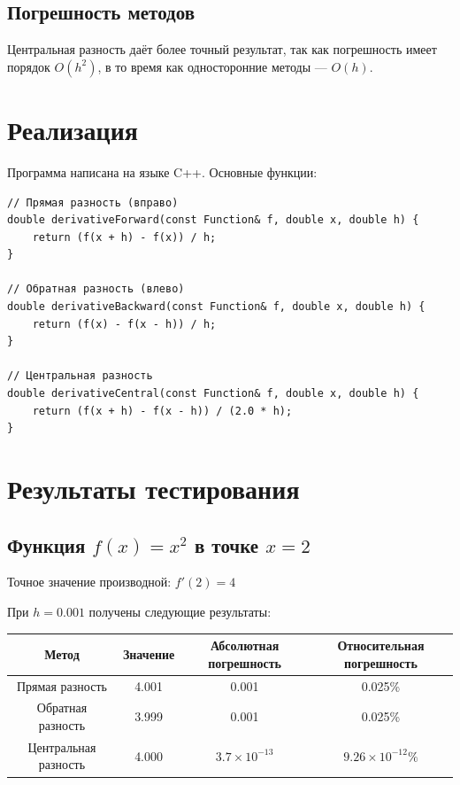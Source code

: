 \documentclass[12pt,a4paper]{article}
\begin{document}
\subsection{Погрешность методов}

Центральная разность даёт более точный результат, так как погрешность имеет порядок $O(h^2)$, в то время как односторонние методы — $O(h)$.

\section{Реализация}

Программа написана на языке C++. Основные функции:

\begin{lstlisting}
// Прямая разность (вправо)
double derivativeForward(const Function& f, double x, double h) {
    return (f(x + h) - f(x)) / h;
}

// Обратная разность (влево)
double derivativeBackward(const Function& f, double x, double h) {
    return (f(x) - f(x - h)) / h;
}

// Центральная разность
double derivativeCentral(const Function& f, double x, double h) {
    return (f(x + h) - f(x - h)) / (2.0 * h);
}
\end{lstlisting}

\section{Результаты тестирования}

\subsection{Функция $f(x) = x^2$ в точке $x = 2$}

Точное значение производной: $f'(2) = 4$

При $h = 0.001$ получены следующие результаты:

\begin{table}[h!]
\centering
\begin{tabular}{|c|c|c|c|}
\hline
\textbf{Метод} & \textbf{Значение} & \textbf{Абсолютная погрешность} & \textbf{Относительная погрешность} \\
\hline
Прямая разность & 4.001 & 0.001 & 0.025\% \\
Обратная разность & 3.999 & 0.001 & 0.025\% \\
Центральная разность & 4.000 & $3.7 \times 10^{-13}$ & $9.26 \times 10^{-12}\%$ \\
\hline
\end{tabular}
\end{table}
\end{document}
